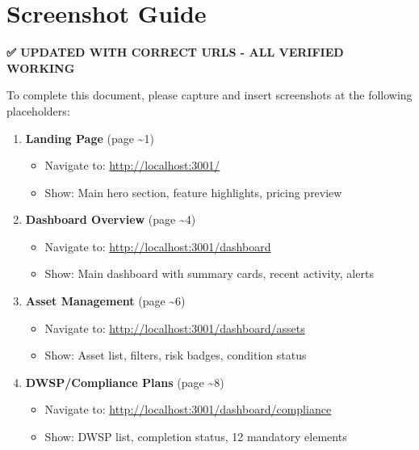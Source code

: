 \documentclass[11pt,a4paper]{article}
\begin{document}
\section*{Screenshot Guide}

\textbf{\textcolor{primaryblue}{✅ UPDATED WITH CORRECT URLS - ALL VERIFIED WORKING}}

\vspace{0.5cm}

To complete this document, please capture and insert screenshots at the following placeholders:

\begin{enumerate}[itemsep=0.5em]
    \item \textbf{Landing Page} (page \textasciitilde1)
    \begin{itemize}
        \item Navigate to: \url{http://localhost:3001/}
        \item Show: Main hero section, feature highlights, pricing preview
    \end{itemize}

    \item \textbf{Dashboard Overview} (page \textasciitilde4)
    \begin{itemize}
        \item Navigate to: \url{http://localhost:3001/dashboard}
        \item Show: Main dashboard with summary cards, recent activity, alerts
    \end{itemize}

    \item \textbf{Asset Management} (page \textasciitilde6)
    \begin{itemize}
        \item Navigate to: \url{http://localhost:3001/dashboard/assets}
        \item Show: Asset list, filters, risk badges, condition status
    \end{itemize}

    \item \textbf{DWSP/Compliance Plans} (page \textasciitilde8)
    \begin{itemize}
        \item Navigate to: \url{http://localhost:3001/dashboard/compliance}
        \item Show: DWSP list, completion status, 12 mandatory elements
    \end{itemize}


\end{enumerate}
\end{document}
